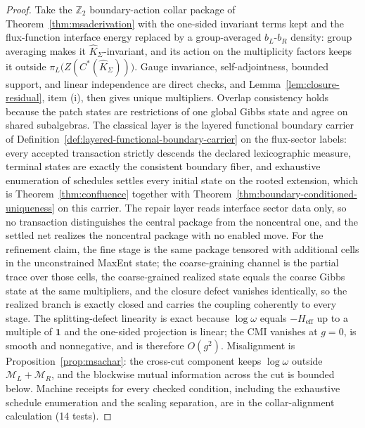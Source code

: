 \documentclass[11pt]{article}
\begin{document}
\begin{proof}
Take the \(\mathbb Z_2\) boundary-action collar package of Theorem~\ref{thm:msaderivation} with the one-sided invariant terms kept and the flux-function interface energy replaced by a group-averaged \(b_L\)-\(b_R\) density: group averaging makes it \(\widehat K_\Sigma\)-invariant, and its action on the multiplicity factors keeps it outside \(\pi_L\bigl(Z(C^*(\widehat K_\Sigma))\bigr)\). Gauge invariance, self-adjointness, bounded support, and linear independence are direct checks, and Lemma~\ref{lem:closure-residual}, item (i), then gives unique multipliers. Overlap consistency holds because the patch states are restrictions of one global Gibbs state and agree on shared subalgebras. The classical layer is the layered functional boundary carrier of Definition~\ref{def:layered-functional-boundary-carrier} on the flux-sector labels: every accepted transaction strictly descends the declared lexicographic measure, terminal states are exactly the consistent boundary fiber, and exhaustive enumeration of schedules settles every initial state on the rooted extension, which is Theorem~\ref{thm:confluence} together with Theorem~\ref{thm:boundary-conditioned-uniqueness} on this carrier. The repair layer reads interface sector data only, so no transaction distinguishes the central package from the noncentral one, and the settled net realizes the noncentral package with no enabled move. For the refinement claim, the fine stage is the same package tensored with additional cells in the unconstrained MaxEnt state; the coarse-graining channel is the partial trace over those cells, the coarse-grained realized state equals the coarse Gibbs state at the same multipliers, and the closure defect vanishes identically, so the realized branch is exactly closed and carries the coupling coherently to every stage. The splitting-defect linearity is exact because \(\log\omega\) equals \(-H_{\mathrm{eff}}\) up to a multiple of \(\mathbf 1\) and the one-sided projection is linear; the CMI vanishes at \(g=0\), is smooth and nonnegative, and is therefore \(O(g^2)\). Misalignment is Proposition~\ref{prop:msachar}: the cross-cut component keeps \(\log\omega\) outside \(\mathcal M_L+\mathcal M_R\), and the blockwise mutual information across the cut is bounded below. Machine receipts for every checked condition, including the exhaustive schedule enumeration and the scaling separation, are in the collar-alignment calculation (14 tests).
\end{proof}
\end{document}
